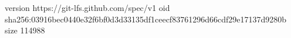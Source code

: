 version https://git-lfs.github.com/spec/v1
oid sha256:03916bec0440e32f6bf0d3d33135df1ceecf83761296d66cdf29e17137d9280b
size 114988
